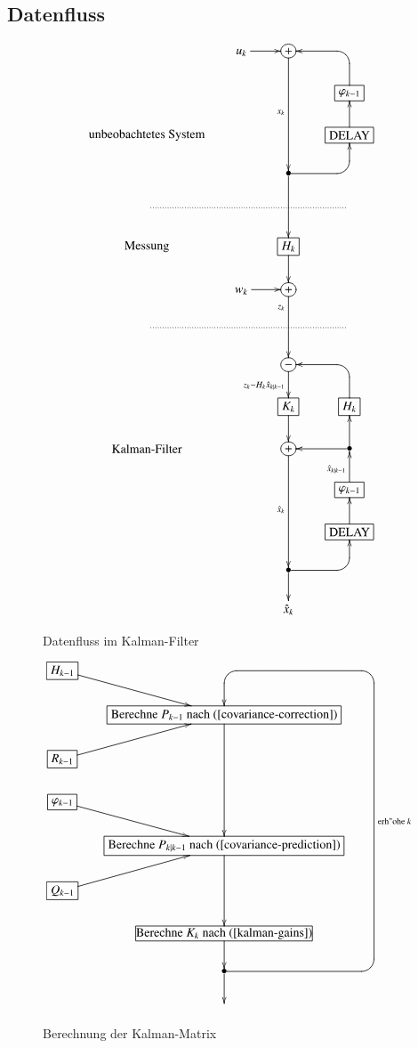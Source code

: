 \subsection{Datenfluss}
\begin{figure}
\[
\xymatrix @-1mm {
&u_k\ar[r]& *+[o][F]{+}\ar[ddd]_{x_k}&                               \\
&&                   & *+[F]{\varphi_{k-1}}\ar `u^l[ul] [ul]          \\
*\txt{unbeobachtetes System}&&                   & *+[F]\txt{DELAY} \ar[u]       \\
&& *{\bullet}\ar[dd]\ar `r^u[ru] [ru]         &                        \\
\ar@{.}[rrr]&&&\\
*\txt{Messung}&& *+[F]{H_k}\ar[d] & \\
&w_k\ar[r]& *+[o][F]{+}\ar[dd]_<<<<{z_k} &                      \\
\ar@{.}[rrr]&&&\\
&& *+[o][F]{-}\ar[d]_{z_k-H_k \hat x_{k|k-1}} &                               \\
&& *+[F]{K_k}\ar[d]  & *+[F]{H_k}\ar `u^l[ul] [ul]   \\
*\txt{Kalman-Filter}&& *+[o][F]{+}\ar[ddd]_{\hat x_k}  & *{\bullet}\ar[u]\ar[l]\\
&&                   & *+[F]{\varphi_{k-1}}\ar[u]^{\hat x_{k|k-1}}            \\
&&                   & *+[F]\txt{DELAY} \ar[u]       \\
&& *{\bullet}\ar `r^u[ru] [ru] \ar[d]&                     \\
&& \hat x_k          &                               \\
}\]
\caption{Datenfluss im Kalman-Filter\label{datenfluss}}
\end{figure}
\begin{figure}
\[
\xymatrix @-1mm {
*+[F]{H_{k-1}}\ar [rd] & & \\
&*+[F]\txt{Berechne $P_{k-1}$ nach (\ref{covariance-correction})}\ar[ddd]&\\
*+[F]{R_{k-1}}\ar[ur] & & \\
*+[F]{\varphi_{k-1}}\ar[dr] & & \\
&*+[F]\txt{Berechne $P_{k|k-1}$ nach (\ref{covariance-prediction})} \ar[dd] & &\\
*+[F]{Q_{k-1}} \ar[ur] & & \\
&*[F]\txt{\strut Berechne $K_k$ nach (\ref{kalman-gains})} \ar[d] && \\
&*{\bullet} \ar `r^u[r] `u^l[ruuuuuuu]_{\text{erh"ohe }k} `l^d[uuuuuuu] [uuuuuu] \ar[d]&&\\
&&&\\
}\]
\caption{Berechnung der Kalman-Matrix\label{k-berechnung}}
\end{figure}
